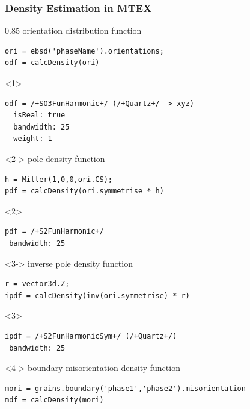 \documentclass[compress,aspectratio=1610,fleqn]{beamer}
\begin{document}
\begin{frame}[fragile]
  \frametitle{Density Estimation in MTEX}

  \begin{overlayarea}{\textwidth}{0.85\textheight}
  orientation distribution function
  \vspace{-0.2cm}
\begin{lstlisting}[style=input]
ori = ebsd('phaseName').orientations;
odf = calcDensity(ori)
\end{lstlisting}
\begin{onlyenv}<1>
  \vspace{-0.2cm}
  \begin{lstlisting}[style=output]
odf = /+SO3FunHarmonic+/ (/+Quartz+/ -> xyz)
  isReal: true
  bandwidth: 25
  weight: 1
  \end{lstlisting}
\end{onlyenv}
\begin{onlyenv}<2->
pole density function  \vspace{-0.2cm}
\begin{lstlisting}[style=input]
h = Miller(1,0,0,ori.CS);
pdf = calcDensity(ori.symmetrise * h)
\end{lstlisting}
\end{onlyenv}
\begin{onlyenv}<2>
  \vspace{-0.2cm}
  \begin{lstlisting}[style=output]
pdf = /+S2FunHarmonic+/
 bandwidth: 25
  \end{lstlisting}
\end{onlyenv}

\begin{onlyenv}<3->
inverse pole density function
\vspace{-0.2cm}
\begin{lstlisting}[style=input]
r = vector3d.Z;
ipdf = calcDensity(inv(ori.symmetrise) * r)
\end{lstlisting}
\end{onlyenv}
\begin{onlyenv}<3>
  \vspace{-0.2cm}
  \begin{lstlisting}[style=output]
ipdf = /+S2FunHarmonicSym+/ (/+Quartz+/)
 bandwidth: 25
\end{lstlisting}
\end{onlyenv}

\begin{onlyenv}<4->
boundary misorientation density function\vspace{-0.2cm}
\begin{lstlisting}[style=input]
mori = grains.boundary('phase1','phase2').misorientation
mdf = calcDensity(mori)
\end{lstlisting}
\end{onlyenv}
\end{overlayarea}
\end{frame}
\end{document}
